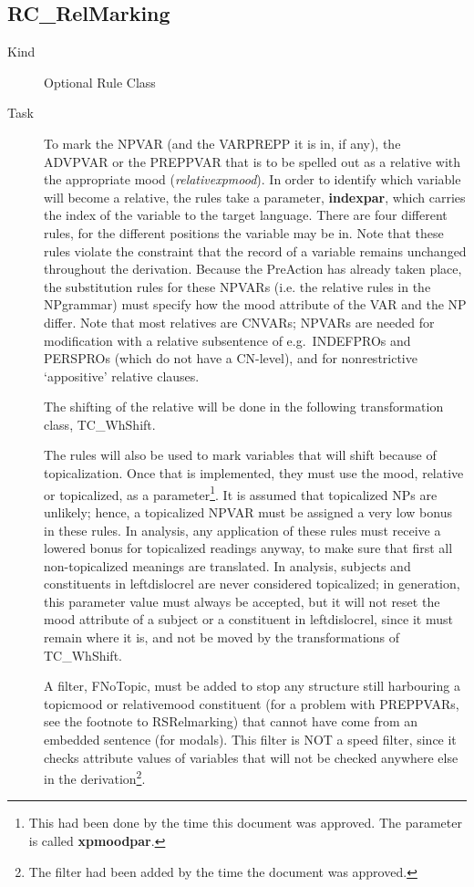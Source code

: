 \newpage
\subsection{RC\_RelMarking}
\begin{description}
\item[Kind] Optional Rule Class
\item[Task] To mark the NPVAR (and the VARPREPP it is in, if any), the ADVPVAR 
or the PREPPVAR that is to be spelled out as a relative with the 
appropriate mood ({\em relativexpmood\/}). In order to identify which variable 
will become a relative, the rules take a parameter, {\bf indexpar}, which 
carries the index of the variable to the target language. There are four 
different rules, for the different positions the variable may be in. Note that 
these rules violate the constraint that the record of a variable remains 
unchanged throughout the derivation. Because the PreAction has 
already taken place, the substitution rules for these NPVARs (i.e. the 
relative rules in the NPgrammar) must specify how the mood attribute of the 
VAR and the NP differ. Note that most relatives are CNVARs; NPVARs are needed 
for modification with a relative subsentence of e.g.\ INDEFPROs and PERSPROs 
(which do not have a CN-level), and for nonrestrictive `appositive' relative 
clauses.

The shifting of the relative will be done in the following transformation 
class, TC\_WhShift.

The rules will also be used to mark variables that will shift because of 
topicalization. Once that is implemented, they must use the mood, relative or 
topicalized, as a parameter\footnote{This had been done by the time this 
document was approved. The parameter is called {\bf xpmoodpar}.}. 
It is assumed that topicalized NPs are unlikely; 
hence, a topicalized NPVAR must be assigned a very low bonus in these rules. 
In analysis, any application of these rules must receive a lowered bonus for 
topicalized readings anyway, to make sure that first all non-topicalized 
meanings are translated. In analysis, subjects and constituents in 
leftdislocrel are never considered 
topicalized; in generation, this parameter value must always be accepted,
but it will 
not reset the mood attribute of a subject or a constituent in leftdislocrel, 
since it must remain where it is, and not be moved by the transformations of 
TC\_WhShift.

A filter, FNoTopic, must be added to stop any structure still harbouring 
a topicmood or relativemood constituent (for a problem with PREPPVARs, see the 
footnote to RSRelmarking) that cannot have come from an embedded sentence (for 
modals). This filter is NOT a speed filter, since it checks attribute values of 
variables that will not be checked anywhere else in the derivation\footnote{The 
filter had been added by the time the document was approved.}.


\end{description}
